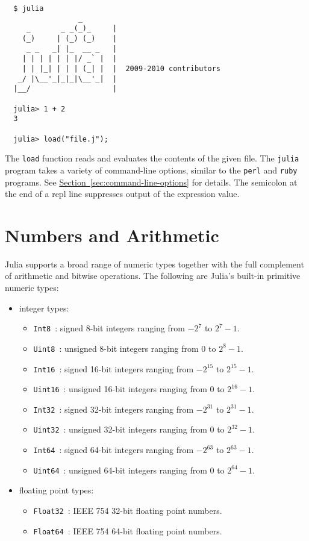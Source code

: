 \documentclass{article}
\newcommand{\Section}[1]{\hyperref[sec:#1]{Section~\ref*{sec:#1}}}
\begin{document}
\begin{verbatim}
  $ julia
                 _      
     _       _ _(_)_     |
    (_)     | (_) (_)    |  
     _ _   _| |_  __ _   |
    | | | | | | |/ _` |  |
    | | |_| | | | (_| |  |  2009-2010 contributors
   _/ |\__'_|_|_|\__'_|  |  
  |__/                   |

  julia> 1 + 2
  3

  julia> load("file.j");
\end{verbatim}
The \verb|load| function reads and evaluates the contents of the given file.
The \verb|julia| program takes a variety of command-line options, similar to the \verb|perl| and \verb|ruby| programs.
See \Section{command-line-options} for details.
The semicolon at the end of a repl line suppresses output of the expression value.

\section{Numbers and Arithmetic}
Julia supports a broad range of numeric types together with the full complement of arithmetic and bitwise operations.
The following are Julia's built-in primitive numeric types:

\begin{itemize}
  \item integer types:
  \begin{itemize}
    \item \verb|Int8|~: signed 8-bit integers ranging from $-2^7$ to $2^7-1$.
    \item \verb|Uint8|~: unsigned 8-bit integers ranging from 0 to $2^8-1$.
    \item \verb|Int16|~: signed 16-bit integers ranging from $-2^{15}$ to $2^{15}-1$.
    \item \verb|Uint16|~: unsigned 16-bit integers ranging from 0 to $2^{16}-1$.
    \item \verb|Int32|~: signed 32-bit integers ranging from $-2^{31}$ to $2^{31}-1$.
    \item \verb|Uint32|~: unsigned 32-bit integers ranging from 0 to $2^{32}-1$.
    \item \verb|Int64|~: signed 64-bit integers ranging from $-2^{63}$ to $2^{63}-1$.
    \item \verb|Uint64|~: unsigned 64-bit integers ranging from 0 to $2^{64}-1$.
  \end{itemize}
  \item floating point types:
  \begin{itemize}
    \item \verb|Float32|~: IEEE 754 32-bit floating point numbers.
    \item \verb|Float64|~: IEEE 754 64-bit floating point numbers.
  \end{itemize}
\end{itemize}
\end{document}

